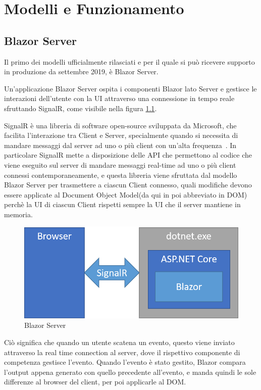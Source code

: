 \chapter{Modelli e Funzionamento}\label{cap:modefunz}
\section{Blazor Server}\label{sez:bserver}
Il primo dei modelli ufficialmente rilasciati e per il quale si pu\`o ricevere supporto in produzione da settembre 2019\cite{blazorServerRelease}, \`e Blazor Server.

Un'applicazione Blazor Server ospita i componenti Blazor lato Server e gestisce le interazioni dell'utente con la UI attraverso una connessione in tempo reale sfruttando SignalR, come visibile nella figura \ref{fig:BlazorServer}.

SignalR \`e una libreria di software open-source sviluppata da Microsoft, che facilita l'interazione tra Client e Server, specialmente quando si necessita di mandare messaggi dal server ad uno o pi\`u client con un'alta frequenza~\cite{signalR}.
In particolare SignalR mette a disposizione delle API che permettono al codice che viene eseguito sul server di mandare messaggi real-time ad uno o pi\`u client connessi contemporaneamente, e questa libreria viene sfruttata dal modello Blazor Server per trasmettere a ciascun Client connesso, quali modifiche devono essere applicate al Document Object Model(da qui in poi abbreviato in DOM) perch\`e la UI di ciascun Client rispetti sempre la UI che il server mantiene in memoria.

\begin{figure}[H]
	\centerline{\includegraphics[scale=0.6]{figure/blazor-server.png}}
	\caption{Blazor Server}
	\label{fig:BlazorServer}
\end{figure}

Ci\`o significa che quando un utente scatena un evento, questo viene inviato attraverso la real time connection al server, dove il rispettivo componente di competenza gestisce l'evento.
Quando l'evento \`e stato gestito, Blazor compara l'output appena generato con quello precedente all'evento, e manda quindi le sole differenze al browser del client, per poi applicarle al DOM.\cite{blazorModelsScenarios}

